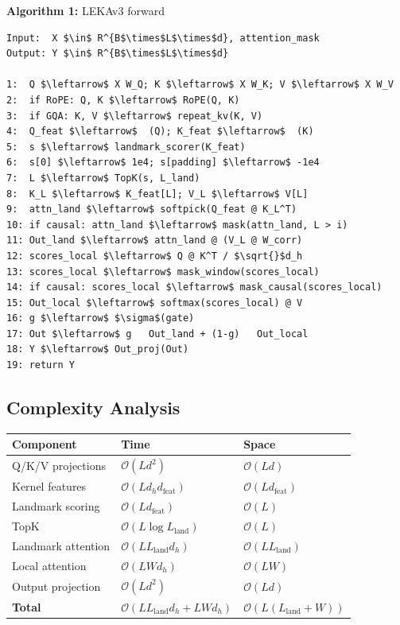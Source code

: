 \textbf{Algorithm 1:} LEKAv3 forward
\begin{lstlisting}
Input:  X $\in$ R^{B$\times$L$\times$d}, attention_mask
Output: Y $\in$ R^{B$\times$L$\times$d}

1:  Q $\leftarrow$ X W_Q; K $\leftarrow$ X W_K; V $\leftarrow$ X W_V
2:  if RoPE: Q, K $\leftarrow$ RoPE(Q, K)
3:  if GQA: K, V $\leftarrow$ repeat_kv(K, V)
4:  Q_feat $\leftarrow$  (Q); K_feat $\leftarrow$  (K)
5:  s $\leftarrow$ landmark_scorer(K_feat)
6:  s[0] $\leftarrow$ 1e4; s[padding] $\leftarrow$ -1e4
7:  L $\leftarrow$ TopK(s, L_land)
8:  K_L $\leftarrow$ K_feat[L]; V_L $\leftarrow$ V[L]
9:  attn_land $\leftarrow$ softpick(Q_feat @ K_L^T)
10: if causal: attn_land $\leftarrow$ mask(attn_land, L > i)
11: Out_land $\leftarrow$ attn_land @ (V_L @ W_corr)
12: scores_local $\leftarrow$ Q @ K^T / $\sqrt{}$d_h
13: scores_local $\leftarrow$ mask_window(scores_local)
14: if causal: scores_local $\leftarrow$ mask_causal(scores_local)
15: Out_local $\leftarrow$ softmax(scores_local) @ V
16: g $\leftarrow$ $\sigma$(gate)
17: Out $\leftarrow$ g   Out_land + (1-g)   Out_local
18: Y $\leftarrow$ Out_proj(Out)
19: return Y
\end{lstlisting}

\subsection{Complexity Analysis}

\begin{table}[H]
\centering
\small
\begin{tabular}{lll}
\toprule
\textbf{Component} & \textbf{Time} & \textbf{Space} \\
\midrule
Q/K/V projections & $\mathcal{O}(L d^2)$ & $\mathcal{O}(L d)$ \\
Kernel features & $\mathcal{O}(L d_h d_\text{feat})$ & $\mathcal{O}(L d_\text{feat})$ \\
Landmark scoring & $\mathcal{O}(L d_\text{feat})$ & $\mathcal{O}(L)$ \\
TopK & $\mathcal{O}(L \log L_\text{land})$ & $\mathcal{O}(L)$ \\
Landmark attention & $\mathcal{O}(L L_\text{land} d_h)$ & $\mathcal{O}(L L_\text{land})$ \\
Local attention & $\mathcal{O}(L W d_h)$ & $\mathcal{O}(L W)$ \\
Output projection & $\mathcal{O}(L d^2)$ & $\mathcal{O}(L d)$ \\
\textbf{Total} & $\mathcal{O}(L L_\text{land} d_h + L W d_h)$ & $\mathcal{O}(L(L_\text{land} + W))$ \\
\bottomrule
\end{tabular}
\end{table}

